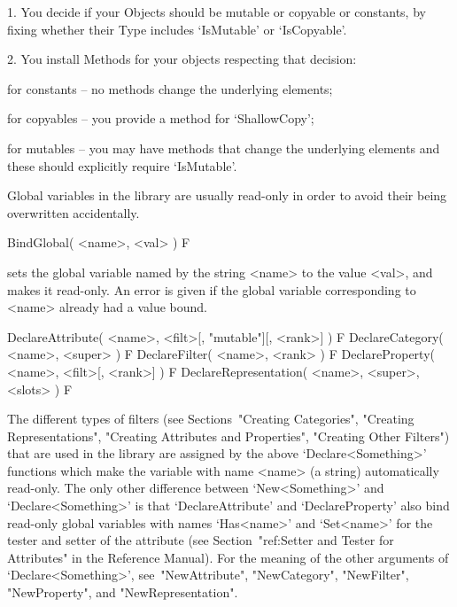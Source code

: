 \beginlist%

\item{1.}
You decide if your Objects should be mutable or copyable or constants, by
fixing whether their Type includes `IsMutable' or `IsCopyable'.

\item{2.}
You install Methods for your objects respecting that decision:

\itemitem{$\bullet$}%
for constants -- no methods change the underlying elements;

\itemitem{$\bullet$}
for copyables -- you provide a method for `ShallowCopy';

\itemitem{$\bullet$}
for mutables  -- you may have methods that change the underlying elements
and these should explicitly require `IsMutable'.

\endlist


Global variables in the {\GAP} library are usually read-only in order to
avoid their being overwritten accidentally.

\>BindGlobal( <name>, <val> ) F

sets the global variable named by the string <name> to the value <val>,
and makes it read-only.
An error is given if the global variable corresponding to <name>
already had a value bound.

\>DeclareAttribute( <name>, <filt>[, "mutable"][, <rank>] ) F
\>DeclareCategory( <name>, <super> ) F
\>DeclareFilter( <name>, <rank> ) F
\>DeclareProperty( <name>, <filt>[, <rank>] ) F
\>DeclareRepresentation( <name>, <super>, <slots> ) F

The different types of filters (see Sections~"Creating Categories",
"Creating Representations", "Creating Attributes and Properties",
"Creating Other Filters") that are used in the {\GAP} library are
assigned by the above `Declare<Something>' functions which make the
variable with name <name> (a string) automatically read-only.
The only other difference between `New<Something>' and
`Declare<Something>' is that `DeclareAttribute' and `DeclareProperty'
also bind read-only global variables with names `Has<name>' and `Set<name>'
for the tester and setter of the attribute
(see Section~"ref:Setter and Tester for Attributes" in the Reference Manual).
For the meaning of the other arguments of `Declare<Something>',
see~"NewAttribute", "NewCategory", "NewFilter", "NewProperty", and
"NewRepresentation".

